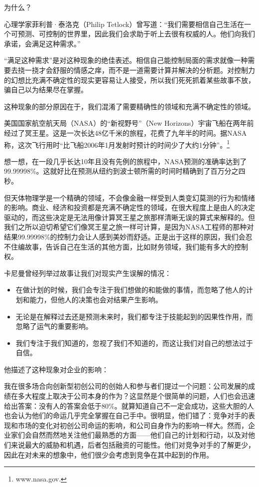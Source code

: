 为什么？

心理学家菲利普·泰洛克（Philip Tetlock）曾写道：“我们需要相信自己生活在一个可预测、可控制的世界里，因此我们会求助于听上去很有权威的人。他们向我们承诺，会满足这种需求。”

“满足这种需求”是对这种现象的绝佳表述。相信自己能控制局面的需求就像一种需要去挠一挠才会舒服的情感之痒，而不是一道需要计算并解决的分析题。对控制力的幻想比充满不确定性的现实更容易让人接受，所以我们死死抓着某些故事不放，骗自己以为结果尽在掌握。

这种现象的部分原因在于，我们混淆了需要精确性的领域和充满不确定性的领域。

美国国家航空航天局（NASA）的“新视野号”（New Horizons）宇宙飞船在两年前经过了冥王星。这是一次长达48亿千米的旅程，花费了九年半的时间。据NASA称，这次飞行用时“比飞船2006年1月发射时预计的时间少了大约1分钟”。\footnote{www.nasa.gov.}

想一想，在一段几乎长达10年且没有先例的旅程中，NASA预测的准确率达到了99.99998\%。这就好比在预测从纽约到波士顿所需的时间时精确到了百万分之四秒。

但天体物理学是一个精确的领域，不会像金融一样受到人类变幻莫测的行为和情绪的影响。商业、经济和投资都是充满不确定性的领域，在很大程度上是由人的决定驱动的，而这些决定是无法用像计算冥王星之旅那样清晰无误的算式来解释的。但我们之所以迫切希望它们像冥王星之旅一样可计算，是因为NASA工程师的那种对结果99.99998\%的控制力会让人感到美妙而舒适。正是出于这样的原因，我们会忍不住编故事，告诉自己在生活的其他方面，比如财务领域，我们能有多大的控制权。

卡尼曼曾经列举过故事让我们对现实产生误解的情况：

\begin{itemize}

\item 在做计划的时候，我们会专注于我们想做的和能做的事情，而忽略了他人的计划和能力，但他人的决策也会对结果产生影响。

\item 无论是在解释过去还是预测未来时，我们都专注于技能起到的因果性作用，而忽略了运气的重要影响。

\item 我们专注于我们知道的，忽视了我们不知道的，而这让我们对自己的想法过于自信。

\end{itemize}

他描述了这种现象对企业的影响：

{\kaishu

我在很多场合向创新型初创公司的创始人和参与者们提过一个问题：公司发展的成绩在多大程度上取决于公司本身的作为？这显然是个很简单的问题，人们也会迅速给出答案：没有人的答案会低于80\%。就算知道自己不一定会成功，这些大胆的人也会认为他们的命运几乎完全掌握在自己手中。很明显，他们错了：竞争对手的表现和市场的变化对初创公司命运的影响，和公司自身作为的影响一样大。然而，企业家们会自然而然地关注他们最熟悉的方面——他们自己的计划和行动，以及对他们来说最大的威胁和机遇，后者包括融资的可能性。他们对竞争对手的了解更少，因此在对未来的想象中，他们很少会考虑到竞争在其中起到的作用。

}

